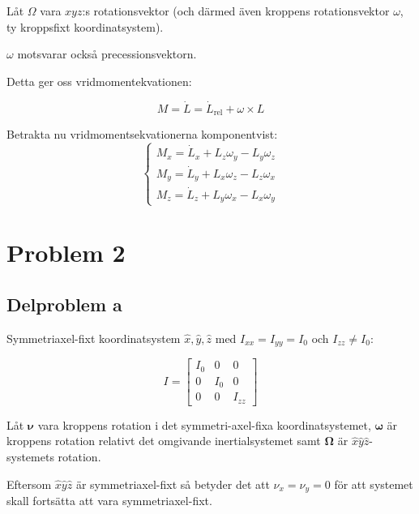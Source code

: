 \documentclass[12pt,a4paper]{article}
\begin{document}
	Låt $\Omega$ vara $xyz$:s rotationsvektor (och därmed även kroppens rotationsvektor $\omega$,
	ty kroppsfixt koordinatsystem).
	
	$\omega$ motsvarar också precessionsvektorn.
	
	
	Detta ger oss vridmomentekvationen:
	
	\begin{equation*}
		M = \dot{L} = \dot{L}_{\mathrm{rel}} + \omega \times L
	\end{equation*}
	
	
	Betrakta nu vridmomentsekvationerna komponentvist:
	\begin{equation}
		\begin{cases}
			M_x = \dot{L}_x + L_z \omega_y - L_y \omega_z \\
			M_y = \dot{L}_y + L_x \omega_z - L_z \omega_x \\
			M_z = \dot{L}_z + L_y \omega_x - L_x \omega_y
		\end{cases}
		\label{vridmomentsekvationerna_komponentvis}
	\end{equation}
	
\section{Problem 2}
	\subsection{Delproblem a}
	Symmetriaxel-fixt koordinatsystem $\hat{x},\hat{y},\hat{z}$ med $I_{xx} = I_{yy} = I_0$ och $I_{zz} \ne I_0$:
	
	\begin{equation*}
		I = \begin{bmatrix}
			I_0 & 0 & 0 \\
			0 & I_0 & 0 \\
			0 & 0 & I_{zz}
		\end{bmatrix}
	\end{equation*}
	
	Låt $\boldsymbol{\nu}$ vara kroppens rotation i det symmetri-axel-fixa koordinatsystemet,
	$\boldsymbol{\omega}$ är kroppens rotation relativt det omgivande inertialsystemet samt $\mathbf{\Omega}$ är
	$\hat{x}\hat{y}\hat{z}$-systemets rotation.
	
	Eftersom $\hat{x}\hat{y}\hat{z}$ är symmetriaxel-fixt så betyder det att $\nu_x = \nu_y = 0$ för att
	systemet skall fortsätta att vara symmetriaxel-fixt.
	
\end{document}
